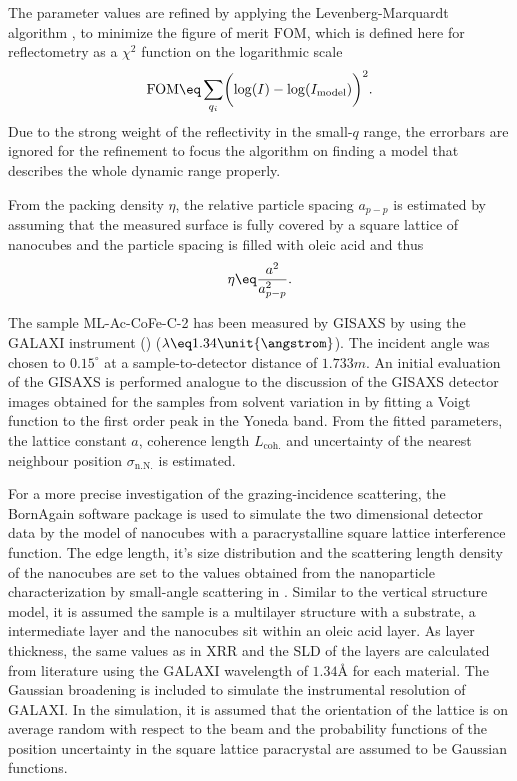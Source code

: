 \documentclass[\main/dresen_thesis.tex]{subfiles}
\begin{document}
    The parameter values are refined by applying the Levenberg-Marquardt algorithm \cite{Marquardt_1963_Analgo}, to minimize the figure of merit $\mathrm{FOM}$, which is defined here for reflectometry as a $\chi^2$ function on the logarithmic scale
    \begin{align}
      \mathrm{FOM} \eq \sum_{q_i} \biggl( \log(I) - \log(I_\mathrm{model})\biggr)^2.
    \end{align}
    Due to the strong weight of the reflectivity in the small-$q$ range, the errorbars are ignored for the refinement to focus the algorithm on finding a model that describes the whole dynamic range properly.

    From the packing density $\eta$, the relative particle spacing $a_{p-p}$ is estimated by assuming that the measured surface is fully covered by a square lattice of nanocubes and the particle spacing is filled with oleic acid and thus
    \begin{align}
      \label{eq:monolayers:characterization:particleSpacing}
      \eta \eq \frac{a^2}{a_{p-p}^2}.
    \end{align}

      The sample ML-Ac-CoFe-C-2 has been measured by GISAXS by using the GALAXI instrument () ($\lambda \eq 1.34 \unit{\angstrom}$).
      The incident angle was chosen to $0.15 ^\circ$ at a sample-to-detector distance of $1.733 \unit{m}$.
      An initial evaluation of the GISAXS is performed analogue to the discussion of the GISAXS detector images obtained for the samples from solvent variation in  by fitting a Voigt function to the first order peak in the Yoneda band.
      From the fitted parameters, the lattice constant $a$, coherence length $L_\mathrm{coh.}$ and uncertainty of the nearest neighbour position $\sigma_\mathrm{n.N.}$ is estimated.

      For a more precise investigation of the grazing-incidence scattering, the BornAgain software package \cite{Burle_2018_borna} is used to simulate the two dimensional detector data by the model of nanocubes with a paracrystalline square lattice interference function.
      The edge length, it's size distribution and the scattering length density of the nanocubes are set to the values obtained from the nanoparticle characterization by small-angle scattering in .
      Similar to the vertical structure model, it is assumed the sample is a multilayer structure with a  substrate, a  intermediate layer and the nanocubes sit within an oleic acid layer.
      As layer thickness, the same values as in XRR and the SLD of the layers are calculated from literature using the GALAXI wavelength of $1.34 \unit{\angstrom}$ for each material.
      The Gaussian broadening is included to simulate the instrumental resolution of GALAXI.
      In the simulation, it is assumed that the orientation of the lattice is on average random with respect to the beam and the probability functions of the position uncertainty in the square lattice paracrystal are assumed to be Gaussian functions.
\end{document}
